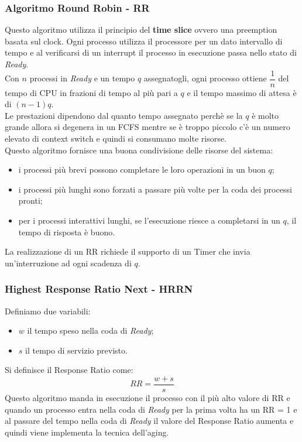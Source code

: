 \documentclass[12pt, letterpaper]{report}
\begin{document}
	\subsubsection{Algoritmo Round Robin - RR}
	Questo algoritmo utilizza il principio del \textbf{time slice} ovvero una preemption basata sul clock. Ogni processo utilizza il processore per un dato intervallo di tempo e al verificarsi di un interrupt il processo in esecuzione passa nello stato di \textit{Ready}. \\
	Con $n$ processi in \textit{Ready} e un tempo $q$ assegnatogli, ogni processo ottiene $\dfrac{1}{n}$ del tempo di CPU in frazioni di tempo al più pari a $q$ e il tempo massimo di attesa è di $(n-1)q$. \\
	Le prestazioni dipendono dal quanto tempo assegnato perchè se la $q$ è molto grande allora si degenera in un FCFS mentre se è troppo piccolo c'è un numero elevato di context switch e quindi si consumano molte risorse. \\
	Questo algoritmo fornisce una buona condivisione delle risorse del sistema:
	\begin{itemize}
		\item i processi più brevi possono completare le loro operazioni in un buon $q$;
		\item i processi più lunghi sono forzati a passare più volte per la coda dei processi pronti;
		\item per i processi interattivi lunghi, se l'esecuzione riesce a completarsi in un $q$, il tempo di risposta è buono.
	\end{itemize}
	La realizzazione di un RR richiede il supporto di un Timer che invia un'interruzione ad ogni scadenza di $q$.
	\subsubsection{Highest Response Ratio Next - HRRN}
	Definiamo due variabili:
	\begin{itemize}
		\item $w$ il tempo speso nella coda di \textit{Ready};
		\item $s$ il tempo di servizio previsto.
	\end{itemize}
	Si definisce il Response Ratio come:
	\[
	RR = \frac{w + s}{s}
	\]
	Questo algoritmo manda in esecuzione il processo con il più alto valore di RR e quando un processo entra nella coda di \textit{Ready} per la prima volta ha un RR = 1 e al passare del tempo nella coda di \textit{Ready} il valore del Response Ratio aumenta e quindi viene implementa la tecnica dell'aging.
\end{document}
